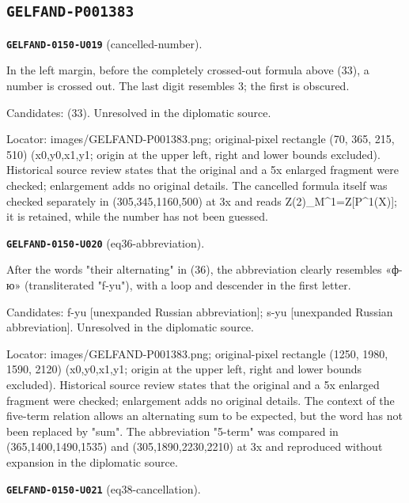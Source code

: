 \documentclass[11pt]{article}
\theoremstyle{definition}
\theoremstyle{remark}
\begin{document}
\subsection*{\texttt{GELFAND-P001383}}
\noindent\leavevmode{}\label{GELFAND-P001383:cancelled-number:note}\textbf{\texttt{GELFAND-0150-U019}} (cancelled-number).\par\nopagebreak[4]
In the left margin, before the completely crossed-out formula above (33), a number is crossed out. The last digit resembles 3; the first is obscured.\par
Candidates: (33). Unresolved in the diplomatic source.\par
Locator: images/GELFAND-P001383.png; original-pixel rectangle (70, 365, 215, 510) (x0,y0,x1,y1; origin at the upper left, right and lower bounds excluded). Historical source review states that the original and a 5x enlarged fragment were checked; enlargement adds no original details. The cancelled formula itself was checked separately in (305,345,1160,500) at 3x and reads Z(2)\_M\textasciicircum{}1=Z[P\textasciicircum{}1(X)]; it is retained, while the number has not been guessed.\par\medskip
\noindent\leavevmode{}\label{GELFAND-P001383:eq36-abbreviation:note}\textbf{\texttt{GELFAND-0150-U020}} (eq36-abbreviation).\par\nopagebreak[4]
After the words "their alternating" in (36), the abbreviation clearly resembles «ф-ю» (transliterated "f-yu"), with a loop and descender in the first letter.\par
Candidates: f-yu [unexpanded Russian abbreviation]; s-yu [unexpanded Russian abbreviation]. Unresolved in the diplomatic source.\par
Locator: images/GELFAND-P001383.png; original-pixel rectangle (1250, 1980, 1590, 2120) (x0,y0,x1,y1; origin at the upper left, right and lower bounds excluded). Historical source review states that the original and a 5x enlarged fragment were checked; enlargement adds no original details. The context of the five-term relation allows an alternating sum to be expected, but the word has not been replaced by "sum". The abbreviation "5-term" was compared in (365,1400,1490,1535) and (305,1890,2230,2210) at 3x and reproduced without expansion in the diplomatic source.\par\medskip
\noindent\leavevmode{}\label{GELFAND-P001383:eq38-cancellation:note}\textbf{\texttt{GELFAND-0150-U021}} (eq38-cancellation).\par\nopagebreak[4]
\end{document}

